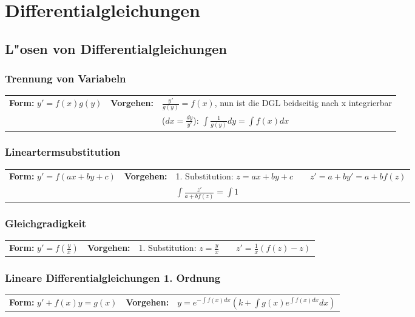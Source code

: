 \section{Differentialgleichungen }

\subsection{L"osen von Differentialgleichungen}

\subsubsection{Trennung von Variabeln }
\begin{tabular}{p{4cm}p{1.5cm}p{10.5cm}}
\textbf{Form:} $y' = f(x) g(y)$ &
\textbf{Vorgehen:}              &
$\frac{y'}{g(y)} = f(x)$, nun ist die DGL beidseitig nach x integrierbar\\  &&
($dx = \frac{dy}{y'}$): $\int \frac{1}{g(y)} dy = \int f(x) dx$ 
\end{tabular}

\subsubsection{Lineartermsubstitution }
\begin{tabular}{p{4cm}p{1.5cm}p{10.5cm}}
\textbf{Form:} $y'=f(ax+by+c)$   &
\textbf{Vorgehen:}               &
1. Substitution: $z=ax+by+c \qquad z'=a+by' =a+bf(z)$\\ &&
$\int\frac{z'}{a+bf(z)} = \int 1$
\end{tabular}

\subsubsection{Gleichgradigkeit}
\begin{tabular}{p{4cm}p{1.5cm}p{10.5cm}}
\textbf{Form:} $y'=f(\frac{y}{x})$ &
\textbf{Vorgehen:}                &
1. Substitution: $z=\frac{y}{x} \qquad
z'=\frac{1}{x}(f(z)-z)$
\end{tabular}

\subsubsection{Lineare Differentialgleichungen 1. Ordnung }
\begin{tabular}{p{4cm}p{1.5cm}p{10.5cm}}
\textbf{Form:} $ y'+f(x)y = g(x) $ &
\textbf{Vorgehen:}                 &
$ y=e^{-\int f(x) dx}(k+\int g(x)e^{\int f(x)dx}dx)$
\end{tabular}

